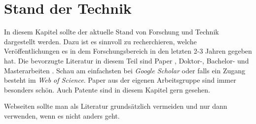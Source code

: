 


\section{Stand der Technik}

In diesem Kapitel sollte der aktuelle Stand von Forschung und Technik dargestellt werden. Dazu ist es sinnvoll zu recherchieren, welche Veröffentlichungen es in dem Forschungsbereich in den letzten 2-3 Jahren gegeben hat. Die bevorzugte Literatur in diesem Teil sind Paper \citep{Peters2017,Peters2018,Bruggeman2013}, Doktor-, Bachelor- und Masterarbeiten \citep{Hirschberg2017,Freier2013}. Schau am einfachsten bei \textit{Google Scholar} oder falls ein Zugang besteht im \textit{Web of Science}. Paper aus der eigenen Arbeitsgruppe sind immer besonders schön. Auch Patente \cite{Liepack2011} sind in diesem Kapitel gern gesehen. 

Webseiten \citep{Northstar2018} sollte man als Literatur grundsätzlich vermeiden und nur dann verwenden, wenn es nicht anders geht.








